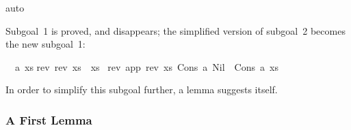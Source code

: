 \begin{isabellebody}
{}auto{}%
\begin{isamarkuptxt}%
Subgoal~1 is proved, and disappears; the simplified version
of subgoal~2 becomes the new subgoal~1:
\begin{isabelle}%
\ {}{}\ {}a\ xs{}\isanewline
{}rev\ {}rev\ xs{}\ {}\ xs\ {}\isanewline
{}rev\ {}app\ {}rev\ xs{}\ {}Cons\ a\ Nil{}{}\ {}\ Cons\ a\ xs%
\end{isabelle}
In order to simplify this subgoal further, a lemma suggests itself.

\subsubsection{A First Lemma}


\end{isamarkuptxt}
\end{isabellebody}

